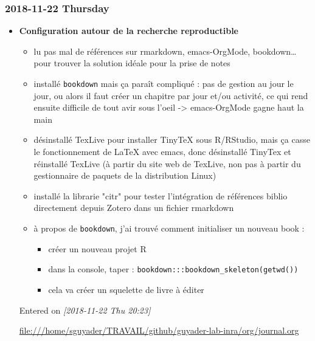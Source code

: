 \documentclass[a4paper]{article}
\begin{document}
\subsubsection*{2018-11-22 Thursday}
\label{sec:orgea5538b}
\begin{itemize}
\item \textbf{Configuration autour de la recherche reproductible}
\label{sec:orgedd6e1b}
\begin{itemize}
\item lu pas mal de références sur rmarkdown, emacs-OrgMode,
bookdown\ldots{} pour trouver la solution idéale pour la prise de notes
\item installé \texttt{bookdown} mais ça paraît compliqué : pas de gestion au jour
le jour, ou alors il faut créer un chapitre par jour et/ou activité,
ce qui rend ensuite difficile de tout avir sous l'oeil ->
emacs-OrgMode gagne haut la main
\item désinstallé TexLive pour installer TinyTeX sous R/RStudio, mais ça
casse le fonctionnement de \LaTeX{} avec emacs, donc désinstallé
TinyTex et réinstallé TexLive (à partir du site web de TexLive, non
pas à partir du gestionnaire de paquets de la distribution Linux)
\item installé la librarie "citr" pour tester l'intégration de références
biblio directement depuis Zotero dans un fichier rmarkdown
\item à propos de \texttt{bookdown}, j'ai trouvé comment initialiser un nouveau
book :
\begin{itemize}
\item créer un nouveau projet R
\item dans la console, taper : \texttt{bookdown:::bookdown\_skeleton(getwd())}
\item cela va créer un squelette de livre à éditer
\end{itemize}
\end{itemize}

Entered on \textit{[2018-11-22 Thu 20:23]}

\url{file:///home/sguyader/TRAVAIL/github/guyader-lab-inra/org/journal.org}
\end{itemize}
\end{document}
